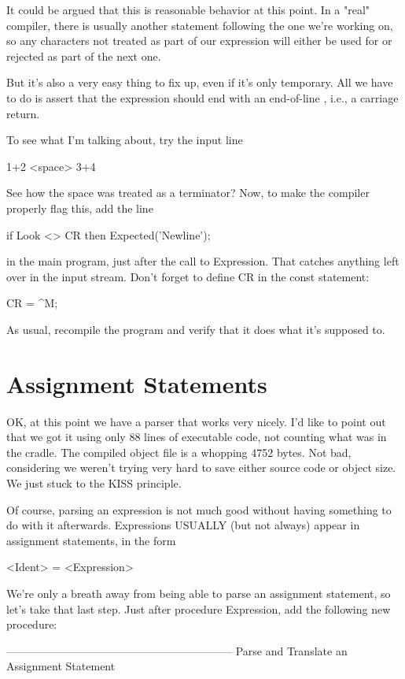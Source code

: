 \documentclass[float=false, crop=false]{standalone}
\begin{document}
It could be argued that this is reasonable behavior at this point. In a "real"
compiler, there is usually another statement following the one we're working on,
so any characters not treated as part of our expression will either be used for
or rejected as part of the next one.

But it's also a very easy thing to fix up, even if it's only temporary. All we
have to do is assert that the expression should end with an end-of-line , i.e.,
a carriage return.

To see what I'm talking about, try the input line

               1+2 <space> 3+4

See how the space was treated as a terminator? Now, to make the compiler
properly flag this, add the line

               if Look <> CR then Expected('Newline');

in the main program, just after the call to Expression. That catches anything
left over in the input stream. Don't forget to define CR in the const statement:

               CR = ^M;

As usual, recompile the program and verify that it does what it's supposed to.


\section{Assignment Statements}

OK, at this point we have a parser that works very nicely. I'd like to point out
that we got it using only 88 lines of executable code, not counting what was in
the cradle. The compiled object file is a whopping 4752 bytes. Not bad,
considering we weren't trying very hard to save either source code or object
size. We just stuck to the KISS principle.

Of course, parsing an expression is not much good without having something to do
with it afterwards. Expressions USUALLY (but not always) appear in assignment
statements, in the form

          <Ident> = <Expression>

We're only a breath away from being able to parse an assignment statement, so
let's take that last step. Just after procedure Expression, add the following
new procedure:


{--------------------------------------------------------------}
{ Parse and Translate an Assignment Statement }
\end{document}
